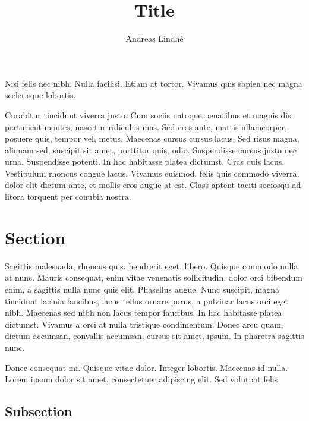 \documentclass[a4paper]{article}
\title{Title}
\author{Andreas Lindhé} %
\begin{document}
\maketitle

\tableofcontents
\newpage

\abstract

Nisi felis nec nibh. Nulla facilisi. Etiam at tortor. Vivamus quis sapien nec
magna scelerisque lobortis.

Curabitur tincidunt viverra justo. Cum sociis natoque penatibus et magnis dis
parturient montes, nascetur ridiculus mus. Sed eros ante, mattis ullamcorper,
posuere quis, tempor vel, metus. Maecenas cursus cursus lacus. Sed risus magna,
aliquam sed, suscipit sit amet, porttitor quis, odio. Suspendisse cursus justo
nec urna. Suspendisse potenti. In hac habitasse platea dictumst. Cras quis
lacus. Vestibulum rhoncus congue lacus. Vivamus euismod, felis quis commodo
viverra, dolor elit dictum ante, et mollis eros augue at est. Class aptent
taciti sociosqu ad litora torquent per conubia nostra.


\section{Section} %
Sagittis malesuada, rhoncus quis, hendrerit eget, libero. Quisque commodo nulla
at nunc. Mauris consequat, enim vitae venenatis sollicitudin, dolor orci
bibendum enim, a sagittis nulla nunc quis elit. Phasellus augue. Nunc suscipit,
magna tincidunt lacinia faucibus, lacus tellus ornare purus, a pulvinar lacus
orci eget nibh. Maecenas sed nibh non lacus tempor faucibus. In hac habitasse
platea dictumst. Vivamus a orci at nulla tristique condimentum. Donec arcu quam,
dictum accumsan, convallis accumsan, cursus sit amet, ipsum. In pharetra
sagittis nunc.

Donec consequat mi. Quisque vitae dolor. Integer lobortis. Maecenas id nulla.
Lorem ipsum dolor sit amet, consectetuer adipiscing elit. Sed volutpat felis.

\subsection{Subsection} %
\end{document}
